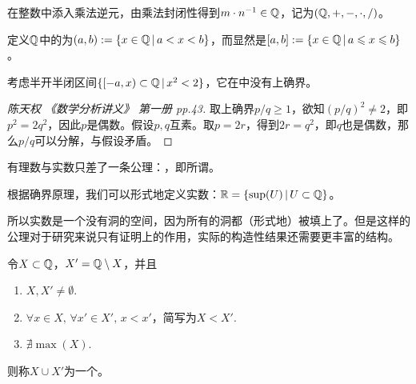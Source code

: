 \begin{definition}[有理数]
	
	在整数中添入乘法逆元，由乘法封闭性得到$m\cdot n^{-1}\in\mathbb{Q}$，记为$(\mathbb{Q},+,-,\cdot,/)$。
	
\end{definition}

\begin{proposition}[有理数的非完备性]
	
	定义$\mathbb{Q}$中的为$(a,b):=\{x\in\mathbb{Q}\,\vert\, a<x<b\}$，而显然是$[a,b]:=\{x\in\mathbb{Q}\,\vert\, a\leqslant x\leqslant b\}$。
	
	考虑半开半闭区间$\{[-a,x)\subset\mathbb{Q}\,\vert\, x^2<2\}$，它在\QQ 中没有上确界。
	
	\begin{proof}[陈天权 《数学分析讲义》 第一册 pp.43]
		
		取上确界$p/q\geqslant 1$，欲知$(p/q)^2\neq 2$，即$p^2=2q^2$，因此$p$是偶数。假设$p,q$互素。取$p=2r$，得到$2r=q^2$，即$q$也是偶数，那么$p/q$可以分解，与假设矛盾。
		
	\end{proof}
	
\end{proposition}

有理数与实数只差了一条公理：，即所谓。

\begin{definition}[实数]
	
	根据确界原理，我们可以形式地定义实数：$\mathbb{R} = \{\sup(U)\,\vert\, U\subset \mathbb{Q}\}$。
	
\end{definition}

所以实数是一个没有洞的空间，因为所有的洞都（形式地）被填上了。但是这样的公理对于研究来说只有证明上的作用，实际的构造性结果还需要更丰富的结构。

\begin{definition}[Dedekind分割]
	
	令$X\subset\mathbb{Q}$，$X'=\mathbb{Q}\setminus X$，并且
	
	\begin{enumerate}
		
		\item $X,X'\neq\emptyset$.
		
		\item $\forall x\in X,\, \forall x'\in X',\, x<x'$，简写为$X<X'$.
		
		\item $\nexists\max(X)$.
		
	\end{enumerate}
	
	则称$X\cup X'$为一个。
	
\end{definition}

